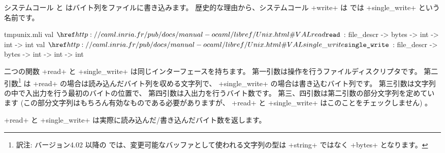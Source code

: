 システムコール  と  はバイト列をファイルに書き込みます。
歴史的な理由から、システムコール \ml+write+ は \ocaml では \ml+single_write+ という名前です。
%
\begin{listingcodefile}{tmpunix.mli}
val $\libvalue{Unix}{read}$ : file_descr -> bytes -> int -> int -> int
val $\libvalue{Unix}{single\_write}$ : file_descr -> bytes -> int -> int -> int
\end{listingcodefile}
%
二つの関数 \ml+read+ と \ml+single_write+ は同じインターフェースを持ちます。
第一引数は操作を行うファイルディスクリプタです。
第二引数\footnote{
  訳注: バージョン4.02 以降の \ocaml では、変更可能なバッファとして使われる文字列の型は \ml+string+ ではなく
  \ml+bytes+ となります。}
は \ml+read+ の場合は読み込んだバイト列を収める文字列で、
\ml+single_write+ の場合は書き込むバイト列です。
第三引数は文字列の中で入出力を行う最初のバイトの位置で、
第四引数は入出力を行うバイト数です。
第三、四引数は第二引数の部分文字列を定めています
(この部分文字列はもちろん有効なものである必要がありますが、
\ml+read+ と \ml+single_write+ はこのことをチェックしません) 。
%
\begin{myimage}[width="85\%"]
\end{myimage}
%
\ml+read+ と \ml+single_write+ は実際に読み込んだ/書き込んだバイト数を返します。

